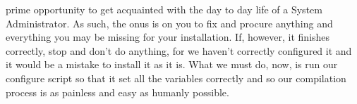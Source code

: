 \documentclass[]{article}
\begin{document}
                                                                                     prime opportunity to get acquainted with the day to day life of a System Administrator. As such, the onus is 
                                                                                     on you to fix and procure anything and everything you may be missing for your installation. If, however, it 
                                                                                     finishes correctly, stop and don't do anything, for we haven't correctly configured it and it would be a 
                                                                                     mistake to install it as it is. What we must do, now, is run our configure script so that it set all the 
                                                                                     variables correctly and so our compilation process is as painless and easy as humanly possible.
\end{document}
